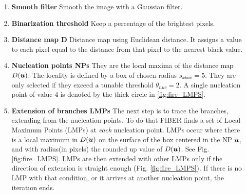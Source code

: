  \begin{enumerate}[label=\textbf{\Alph*}]

 \item \textbf{Smooth filter} Smooth the image with a Gaussian filter.
 \item \textbf{Binarization threshold} Keep a percentage of the brightest pixels.
 \item \textbf{Distance map D} Distance map using Euclidean distance. It
 assigns a value to each pixel equal to the distance from that pixel to the nearest black value.

 \item \textbf{Nucleation points NPs} They are the
 local maxima of the distance map $D(\boldsymbol{u})$. The locality is defined by a
 box of chosen radius $s_{xbox}=5$. They are only selected if they
 exceed a tunable threshold $\theta_{nuc}=2$. A single nucleation point of
 value $4$ is denoted by the thick circle in \ref{fig:fire_LMPS}.

 \item \textbf{Extension of branches LMPs} The next step is to trace the
 branches, extending from the nucleation points. To do that FIBER finds a set of
 Local Maximum Points (LMPs) at \emph{each} nucleation point. LMPs occur where
 there is a local maximum in $D(\boldsymbol{u})$ on the surface of the box centered in the NP
 $\boldsymbol{u}$, and with radius(in pixels) the rounded up value of $D(\boldsymbol{u})$.
 See Fig. \ref{fig:fire_LMPS}. LMPs are then extended with other
 LMPs only if the direction of extension is straight enough
 (Fig. \ref{fig:fire_LMPS}). If there is no LMP with that
 condition, or it arrives at another nucleation point, the iteration ends.
 \end{enumerate}


